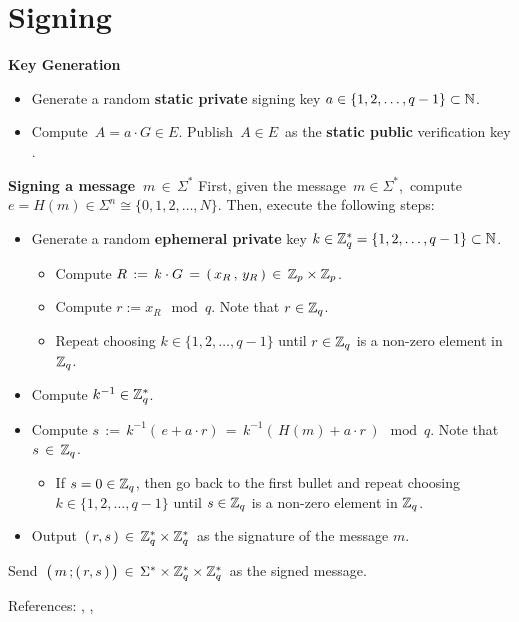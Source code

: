 
\section{Signing}
\setcounter{theorem}{0}
\setcounter{equation}{0}

\vskip 0.2cm
\noindent
\textbf{Key Generation}
\begin{itemize}
\item
	Generate a random \textbf{\color{red}static private} signing key
	$a \in \{1,2,\ldots,q-1\} \subset \mathbb{N}$.
\item
	Compute \,$A = a \cdot G \in E$.
	Publish \,$A \in E$\, as the \textbf{\color{red}static public} verification key .
\end{itemize}

\vskip 0.3cm
\noindent
\textbf{Signing a message \,$m \,\in\, \Sigma^{*}$}
\vskip 0.3cm
\noindent
First, given the message \,$m \in \Sigma^{*}$,\,
compute \,$e = H(m) \in \Sigma^{n} \cong \{0,1,2,\ldots,N\}$.
\vskip 0.3cm
\noindent
Then, execute the following steps:
\begin{itemize}
\item
	Generate a random \textbf{\color{red}ephemeral private} key
	$k \in \mathbb{Z}_{q}^{*} = \{1,2,\ldots,q-1\} \subset \mathbb{N}$.
	\begin{itemize}
	\item
		Compute $R \, := \, k \cdot G \,=\, \left(\,x_{R}\,,\,y_{R}\,\right) \,\in\, \mathbb{Z}_{p} \times \mathbb{Z}_{p}$.
	\item
		Compute $r := x_{R} \!\mod q$.\; Note that $r \in \mathbb{Z}_{q}$.
	\item
		Repeat choosing $k \in \{1,2,\ldots,q-1\}$ until $r \in \mathbb{Z}_{q}$ is a non-zero element in $\mathbb{Z}_{q}$.
	\end{itemize}
\item
	Compute $k^{-1} \in \mathbb{Z}_{q}^{*}$.
\item
	Compute $s \, := \, k^{-1}\left(\,e + a \cdot r\right) \, = \, k^{-1}\left(\,H(m) + a \cdot r\,\right)\!\!\mod q$.\;
	Note that $s \,\in\, \mathbb{Z}_{q}$.
	\begin{itemize}
	\item
		If $s = 0 \in \mathbb{Z}_{q}$, then go back to the first bullet and
		repeat choosing $k \in \{1,2,\ldots,q-1\}$
		until $s \in \mathbb{Z}_{q}$ is a non-zero element in $\mathbb{Z}_{q}$.
	\end{itemize}
\item
	Output \,$(\,r,s\,) \,\in\, \mathbb{Z}_{q}^{*} \times \mathbb{Z}_{q}^{*}$\,
	as the signature of the message $m$.
\end{itemize}
\vskip 0.3cm
\noindent
Send
\,$\left(\,m \,\overset{{\color{white}.}}{;}\,(\,r,s\,)\,\right) \,\in\, \Sigma^{*} \times \Z_{q}^{*} \times \Z_{q}^{*}$\,
as the signed message.

\vskip 0.5cm
\noindent
References: \cite{Yan2013}, \cite{Paar2010}, \cite{Garrett2005}
